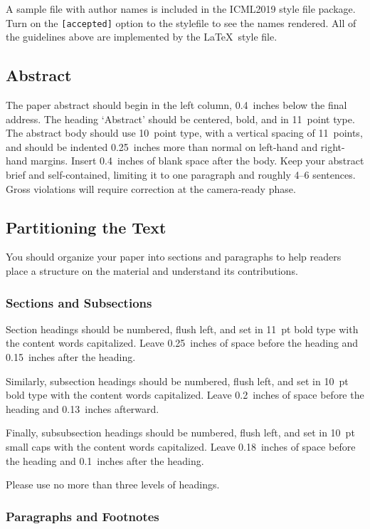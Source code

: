 \documentclass{article}
\begin{document}
A sample file with author names is included in the ICML2019 style file
package. Turn on the \texttt{[accepted]} option to the stylefile to
see the names rendered. All of the guidelines above are implemented
by the \LaTeX\ style file.

\subsection{Abstract}

The paper abstract should begin in the left column, 0.4~inches below the final
address. The heading `Abstract' should be centered, bold, and in 11~point type.
The abstract body should use 10~point type, with a vertical spacing of
11~points, and should be indented 0.25~inches more than normal on left-hand and
right-hand margins. Insert 0.4~inches of blank space after the body. Keep your
abstract brief and self-contained, limiting it to one paragraph and roughly 4--6
sentences. Gross violations will require correction at the camera-ready phase.

\subsection{Partitioning the Text}

You should organize your paper into sections and paragraphs to help
readers place a structure on the material and understand its
contributions.

\subsubsection{Sections and Subsections}

Section headings should be numbered, flush left, and set in 11~pt bold
type with the content words capitalized. Leave 0.25~inches of space
before the heading and 0.15~inches after the heading.

Similarly, subsection headings should be numbered, flush left, and set
in 10~pt bold type with the content words capitalized. Leave
0.2~inches of space before the heading and 0.13~inches afterward.

Finally, subsubsection headings should be numbered, flush left, and
set in 10~pt small caps with the content words capitalized. Leave
0.18~inches of space before the heading and 0.1~inches after the
heading.

Please use no more than three levels of headings.

\subsubsection{Paragraphs and Footnotes}
\end{document}
